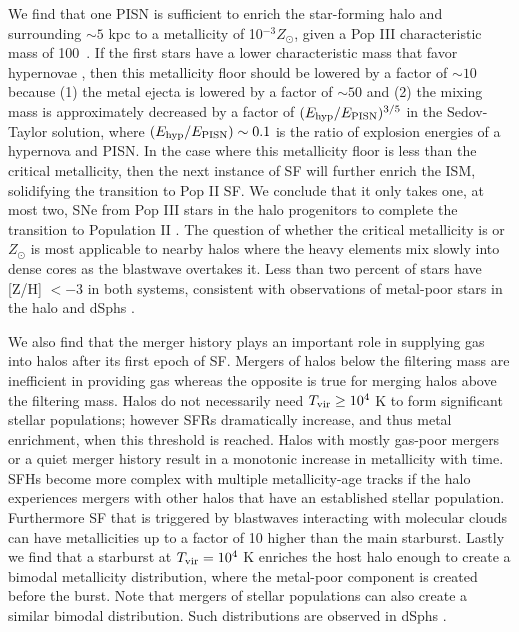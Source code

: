 \documentclass[apjl]{emulateapj}
\begin{document}
We find that one PISN is sufficient to enrich the star-forming halo
and surrounding $\sim 5$ kpc to a metallicity of 10$^{-3} Z_\odot$,
given a Pop III characteristic mass of 100~\Ms.  If the first stars
have a lower characteristic mass that favor hypernovae
\citep{Tumlinson07_IMF}, then this metallicity floor should be lowered
by a factor of $\sim 10$ because (1) the metal ejecta is lowered by a
factor of $\sim 50$ and (2) the mixing mass is approximately decreased
by a factor of $(E_{\rm hyp}/E_{\rm PISN})^{3/5}$ in the Sedov-Taylor
solution, where $(E_{\rm hyp}/E_{\rm PISN}) \sim 0.1$ is the ratio of
explosion energies of a hypernova and PISN.  In the case where this
metallicity floor is less than the critical metallicity, then the next
instance of SF will further enrich the ISM, solidifying the transition
to Pop II SF.  We conclude that it only takes one, at most two, SNe
from Pop III stars in the halo progenitors to complete the transition
to Population II \citep[see also][]{Frebel10}.  The question of
whether the critical metallicity is  or 
$Z_\odot$ is most applicable to nearby halos where the heavy elements
mix slowly into dense cores as the blastwave overtakes it.  Less than
two percent of stars have [Z/H] $< -3$ in both systems, consistent
with observations of metal-poor stars in the halo and dSphs
\citep[e.g.][]{Beers05, Frebel10_Obs}.

We also find that the merger history plays an important role in
supplying gas into halos after its first epoch of SF.  Mergers of
halos below the filtering mass are inefficient in providing gas
whereas the opposite is true for merging halos above the filtering
mass.  Halos do not necessarily need $\tvir \ge 10^4$ K to form
significant stellar populations; however SFRs dramatically increase,
and thus metal enrichment, when this threshold is reached.  Halos with
mostly gas-poor mergers or a quiet merger history result in a
monotonic increase in metallicity with time.  SFHs become more complex
with multiple metallicity-age tracks if the halo experiences mergers
with other halos that have an established stellar population.
Furthermore SF that is triggered by blastwaves interacting with
molecular clouds can have metallicities up to a factor of 10 higher
than the main starburst.  Lastly we find that a starburst at $\tvir =
10^4$ K enriches the host halo enough to create a bimodal metallicity
distribution, where the metal-poor component is created before the
burst.  Note that mergers of stellar populations can also create a
similar bimodal distribution.  Such distributions are observed in
dSphs \citep[e.g.][]{Battaglia10}.
\end{document}
